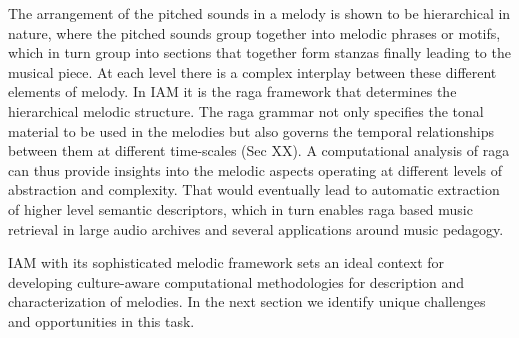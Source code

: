 The arrangement of the pitched sounds in a melody is shown to be hierarchical in nature, where the pitched sounds group together into melodic phrases or motifs, which in turn group into sections that together form stanzas finally leading to the musical piece. At each level there is a complex interplay between these different elements of melody. In IAM it is the raga framework that determines the hierarchical melodic structure. The raga grammar not only specifies the tonal material to be used in the melodies but also governs the temporal relationships between them at different time-scales (Sec XX). A computational analysis of raga can thus provide insights into the melodic aspects operating at different levels of abstraction and complexity. That would eventually lead to automatic extraction of higher level semantic descriptors, which in turn enables raga based music retrieval in large audio archives and several applications around music pedagogy.


IAM with its sophisticated melodic framework sets an ideal context for developing culture-aware computational methodologies for description and characterization of melodies. In the next section we identify unique challenges and opportunities in this task. 


%







